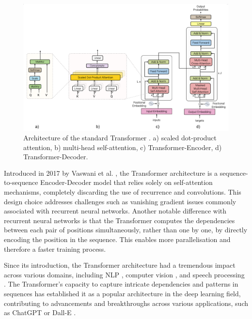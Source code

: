 \begin{figure}[ht]
    \centering
    \includegraphics[width=1\textwidth]{imgs/Transformer_archi.png}
    \caption{Architecture of the standard Transformer \cite{vaswani2017attention}. a) scaled dot-product attention, b) multi-head self-attention, c) Transformer-Encoder, d) Transformer-Decoder.}
    \label{fig:Transformer_archi}
\end{figure}
Introduced in 2017 by Vaswani et al. \cite{vaswani2017attention}, the Transformer architecture is a sequence-to-sequence Encoder-Decoder model that relies solely on self-attention mechanisms, completely discarding the use of recurrence and convolutions. This design choice addresses challenges such as vanishing gradient issues commonly associated with recurrent neural networks. Another notable difference with recurrent neural networks is that the Transformer computes the dependencies between each pair of positions simultaneously, rather than one by one, by directly encoding the position in the sequence. This enables more parallelisation and therefore a faster training process.

Since its introduction, the Transformer architecture had a tremendous impact across various domains, including \ac{NLP} \cite{Bert,brown2020language}, computer vision \cite{dosovitskiy2020image}, and speech processing \cite{dong2018speech}. The Transformer's capacity to capture intricate dependencies and patterns in sequences has established it as a popular architecture in the deep learning field, contributing to advancements and breakthroughs across various applications, such as ChatGPT \cite{bahrini2023chatgpt} or Dall-E \cite{ramesh2021zero}.

